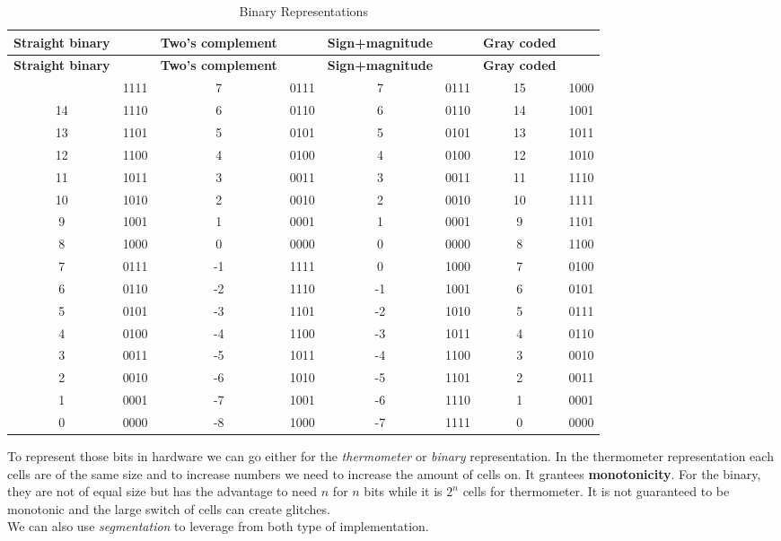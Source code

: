 \documentclass[
  a4paper,
]{article}
\begin{document}
\hypertarget{tab:binary}{}
\begin{longtable}[]{@{}clclclcl@{}}
\caption{Binary Representations}\tabularnewline
\toprule\noalign{}
\textbf{Straight binary} & & \textbf{Two's complement} & &
\textbf{Sign+magnitude} & & \textbf{Gray coded} & \\
\midrule\noalign{}
\endfirsthead
\toprule\noalign{}
\textbf{Straight binary} & & \textbf{Two's complement} & &
\textbf{Sign+magnitude} & & \textbf{Gray coded} & \\
\midrule\noalign{}
\endhead
\bottomrule\noalign{}
\endlastfoot
15 & 1111 & 7 & 0111 & 7 & 0111 & 15 & 1000 \\
14 & 1110 & 6 & 0110 & 6 & 0110 & 14 & 1001 \\
13 & 1101 & 5 & 0101 & 5 & 0101 & 13 & 1011 \\
12 & 1100 & 4 & 0100 & 4 & 0100 & 12 & 1010 \\
11 & 1011 & 3 & 0011 & 3 & 0011 & 11 & 1110 \\
10 & 1010 & 2 & 0010 & 2 & 0010 & 10 & 1111 \\
9 & 1001 & 1 & 0001 & 1 & 0001 & 9 & 1101 \\
8 & 1000 & 0 & 0000 & 0 & 0000 & 8 & 1100 \\
7 & 0111 & -1 & 1111 & 0 & 1000 & 7 & 0100 \\
6 & 0110 & -2 & 1110 & -1 & 1001 & 6 & 0101 \\
5 & 0101 & -3 & 1101 & -2 & 1010 & 5 & 0111 \\
4 & 0100 & -4 & 1100 & -3 & 1011 & 4 & 0110 \\
3 & 0011 & -5 & 1011 & -4 & 1100 & 3 & 0010 \\
2 & 0010 & -6 & 1010 & -5 & 1101 & 2 & 0011 \\
1 & 0001 & -7 & 1001 & -6 & 1110 & 1 & 0001 \\
0 & 0000 & -8 & 1000 & -7 & 1111 & 0 & 0000 \\
\end{longtable}

To represent those bits in hardware we can go either for the
\emph{thermometer} or \emph{binary} representation. In the thermometer
representation each cells are of the same size and to increase numbers
we need to increase the amount of cells on. It grantees
\textbf{monotonicity}. For the binary, they are not of equal size but
has the advantage to need \(n\) for \(n\) bits while it is \(2^n\) cells
for thermometer. It is not guaranteed to be monotonic and the large
switch of cells can create glitches.\\
We can also use \emph{segmentation} to leverage from both type of
implementation.
\end{document}
